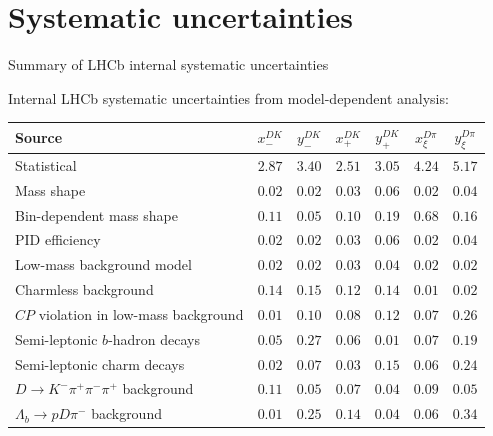 \documentclass[xcolor={dvipsnames}]{beamer}
\begin{document}
\section{Systematic uncertainties}
\begin{frame}{Summary of LHCb internal systematic uncertainties}
  \begin{center}
    Internal LHCb systematic uncertainties from model-dependent analysis:
  \end{center}
  \vspace{-0.3cm}
  \scriptsize
  \vspace{0.02cm}
  \begin{center}
    \begin{tabular}{lcccccc}
        \hline
        Source & $x_-^{DK}$ & $y_-^{DK}$ & $x_+^{DK}$ & $y_+^{DK}$ & $x_\xi^{D\pi}$ & $y_\xi^{D\pi}$ \\
        \hline
        Statistical                                                & $2.87$ & $3.40$ & $2.51$ & $3.05$ & $4.24$ & $5.17$ \\
        \hline
        Mass shape                                                 & $0.02$ & $0.02$ & $0.03$ & $0.06$ & $0.02$ & $0.04$ \\
        Bin-dependent mass shape                                   & $0.11$ & $0.05$ & $0.10$ & $0.19$ & $0.68$ & $0.16$ \\
        PID efficiency                                             & $0.02$ & $0.02$ & $0.03$ & $0.06$ & $0.02$ & $0.04$ \\
        Low-mass background model                                  & $0.02$ & $0.02$ & $0.03$ & $0.04$ & $0.02$ & $0.02$ \\
        Charmless background                                       & $0.14$ & $0.15$ & $0.12$ & $0.14$ & $0.01$ & $0.02$ \\
        $C\!P$ violation in low-mass background                    & $0.01$ & $0.10$ & $0.08$ & $0.12$ & $0.07$ & $0.26$ \\
        Semi-leptonic $b$-hadron decays                            & $0.05$ & $0.27$ & $0.06$ & $0.01$ & $0.07$ & $0.19$ \\
        Semi-leptonic charm decays                                 & $0.02$ & $0.07$ & $0.03$ & $0.15$ & $0.06$ & $0.24$ \\
        $D\to K^-\pi^+\pi^-\pi^+$ background                       & $0.11$ & $0.05$ & $0.07$ & $0.04$ & $0.09$ & $0.05$ \\
        $\Lambda_b\to pD\pi^-$ background                          & $0.01$ & $0.25$ & $0.14$ & $0.04$ & $0.06$ & $0.34$ \\

\end{tabular}
\end{center}
\end{frame}
\end{document}

